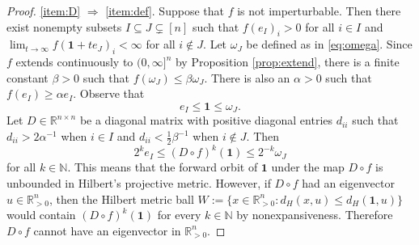 \documentclass[10pt,reqno]{amsart}
\newcommand{\R}{\mathbb{R}}
\newcommand{\N}{\mathbb{N}}
\theoremstyle{plain}
\theoremstyle{definition}
\numberwithin{equation}{section}
\begin{document}
\begin{proof}
\eqref{item:D} $\Rightarrow$ \eqref{item:def}. Suppose that $f$ is not imperturbable. Then there exist nonempty subsets $I \subseteq J \subsetneq [n]$ such that $f(e_I)_i > 0$ for all $i \in I$ and $\lim_{t \rightarrow \infty } f(\mathbf{1} + te_J)_i < \infty$ for all $i \notin J$.  Let $\omega_J$ be defined as in \eqref{eq:omega}.
Since $f$ extends continuously to $(0,\infty]^n$ by Proposition \ref{prop:extend}, there is a finite constant $\beta > 0$ such that $f(\omega_J) \le \beta \omega_J$. There is also an $\alpha > 0$ such that $f(e_I) \ge \alpha e_I$.  
Observe that 
$$e_I \le \mathbf{1} \le \omega_J.$$
Let $D \in \R^{n \times n}$ be a diagonal matrix with positive diagonal entries $d_{ii}$ such that  $d_{ii} > 2 \alpha^{-1}$ when $i \in I$ and $d_{ii} < \tfrac{1}{2} \beta^{-1}$ when $i \notin J$. Then 
$$2^k e_I \le (D \circ f)^k(\mathbf{1}) \le 2^{-k} \omega_J$$
for all $k \in \N$.  This means that the forward orbit of $\mathbf{1}$ under the map $D \circ f$ is unbounded in Hilbert's projective metric. However, if $D \circ f$ had an eigenvector $u \in \R^n_{>0}$, then the Hilbert metric ball $W := \{x \in \R^n_{>0} : d_H(x, u) \le d_H(\mathbf{1}, u) \}$ would contain $(D\circ f)^k(\mathbf{1})$ for every $k \in \N$ by nonexpansiveness. 
Therefore $D \circ f$ cannot have an eigenvector in $\R^n_{>0}$.
\end{proof}
\end{document}
